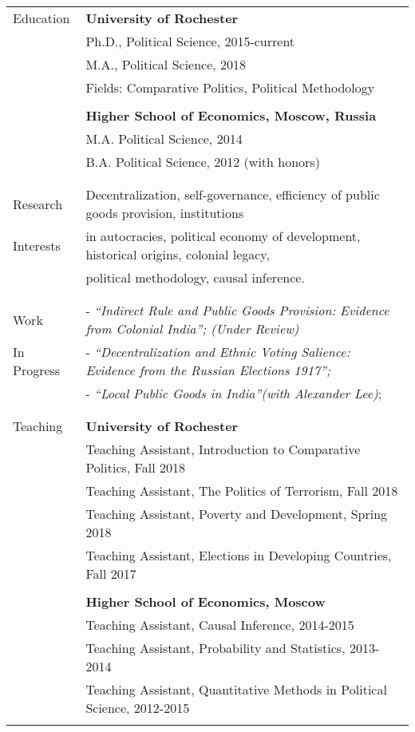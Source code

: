 \documentclass[letterpaper,11pt,oneside]{article}
\begin{document}
\noindent \begin{tabular}{@{} l l}
 \Large{Education}    & \textbf{University of Rochester} \\
     & Ph.D., Political Science, 2015-current \\
     & M.A., Political Science, 2018 \\
     & Fields: Comparative Politics, Political Methodology \\
     \vspace*{-2mm}
     & \\
     & \textbf{Higher School of Economics, Moscow, Russia} \\
     & M.A. Political Science, 2014 \\
     & B.A. Political Science, 2012 (with honors) \\
     & \\

&\\
\Large{Research} & Decentralization, self-governance, efficiency of public goods provision,  institutions  \\
\Large{Interests} &in autocracies, political economy of development, historical origins, colonial legacy, \\
&political methodology, causal inference.\\
 & \\
&\\
\Large{Work}
 & - \textit{``Indirect Rule and Public Goods Provision:
 	Evidence from Colonial India''; (Under Review)}\\
 \Large{In Progress}
 & - \textit{``Decentralization and Ethnic Voting Salience: Evidence from the Russian Elections 1917'';}\\
  &- \textit{``Local Public Goods in India''(with Alexander Lee)};\\
&\\
&\\
 \Large{Teaching}  
 &\textbf{University of Rochester} \\
 & Teaching Assistant, Introduction to Comparative Politics, Fall 2018 \\
 & Teaching Assistant, The Politics of Terrorism, Fall 2018 \\
 & Teaching Assistant, Poverty and Development, Spring 2018 \\
  & Teaching Assistant, Elections in Developing Countries, Fall 2017 \\
  \\
     &\textbf{Higher School of Economics, Moscow} \\
     & Teaching Assistant, Causal Inference, 2014-2015 \\
     & Teaching Assistant, Probability and Statistics, 2013-2014 \\
     & Teaching Assistant, Quantitative Methods in Political Science, 2012-2015 \\
    &\\ 



\end{tabular}
\end{document}
